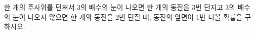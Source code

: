 한 개의 주사위를 던져서 3의 배수의 눈이 나오면 한 개의 동전을 3번 던지고 3의 배수의 눈이 나오지 않으면 한 개의 동전을 2번 던질 때, 동전의 앞면이 1번 나올 확률을 구하시오.

